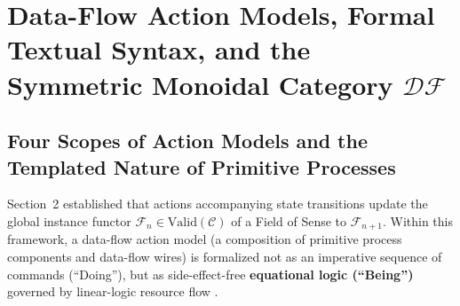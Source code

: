 \documentclass[11pt,a4paper]{article}
\theoremstyle{definition}
\theoremstyle{plain}
\theoremstyle{remark}
\newcommand{\Valid}{\mathrm{Valid}}
\newcommand{\DF}{\mathcal{DF}}
\begin{document}
\section{Data-Flow Action Models, Formal Textual Syntax, and the Symmetric Monoidal Category $\DF$}

\subsection{Four Scopes of Action Models and the Templated Nature of Primitive Processes}
Section~2 established that actions accompanying state transitions update the global instance functor $\mathcal{F}_n \in \Valid(\mathcal{C})$ of a Field of Sense to $\mathcal{F}_{n+1}$. Within this framework, a data-flow action model (a composition of primitive process components and data-flow wires) is formalized not as an imperative sequence of commands (``Doing''), but as side-effect-free \textbf{equational logic (``Being'')} governed by linear-logic resource flow \cite{girard1987}.
\end{document}
